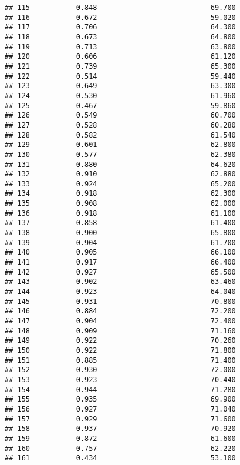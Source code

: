 \documentclass[
]{article}
\begin{document}
\begin{verbatim}
## 115           0.848                           69.700
## 116           0.672                           59.020
## 117           0.706                           64.300
## 118           0.673                           64.800
## 119           0.713                           63.800
## 120           0.606                           61.120
## 121           0.739                           65.300
## 122           0.514                           59.440
## 123           0.649                           63.300
## 124           0.530                           61.960
## 125           0.467                           59.860
## 126           0.549                           60.700
## 127           0.528                           60.280
## 128           0.582                           61.540
## 129           0.601                           62.800
## 130           0.577                           62.380
## 131           0.880                           64.620
## 132           0.910                           62.880
## 133           0.924                           65.200
## 134           0.918                           62.300
## 135           0.908                           62.000
## 136           0.918                           61.100
## 137           0.858                           61.400
## 138           0.900                           65.800
## 139           0.904                           61.700
## 140           0.905                           66.100
## 141           0.917                           66.400
## 142           0.927                           65.500
## 143           0.902                           63.460
## 144           0.923                           64.040
## 145           0.931                           70.800
## 146           0.884                           72.200
## 147           0.904                           72.400
## 148           0.909                           71.160
## 149           0.922                           70.260
## 150           0.922                           71.800
## 151           0.885                           71.400
## 152           0.930                           72.000
## 153           0.923                           70.440
## 154           0.944                           71.280
## 155           0.935                           69.900
## 156           0.927                           71.040
## 157           0.929                           71.600
## 158           0.937                           70.920
## 159           0.872                           61.600
## 160           0.757                           62.220
## 161           0.434                           53.100

\end{verbatim}
\end{document}
